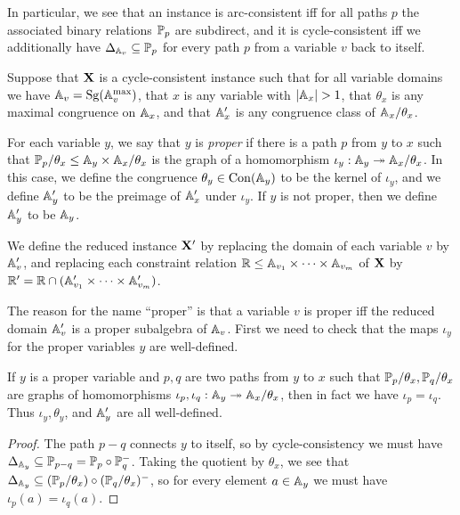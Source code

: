 \documentclass[letterpaper,11pt]{article}
\DeclareMathOperator{\Sg}{Sg}
\DeclareMathOperator{\Con}{Con}
\begin{document}
In particular, we see that an instance is arc-consistent iff for all paths $p$ the associated binary relations $\mathbb{P}_p$ are subdirect, and it is cycle-consistent iff we additionally have $\Delta_{\mathbb{A}_v} \subseteq \mathbb{P}_p$ for every path $p$ from a variable $v$ back to itself.

\begin{defn}\label{defn-proper-red} Suppose that $\mathbf{X}$ is a cycle-consistent instance such that for all variable domains we have $\bA_v = \Sg(\bA_v^{\max})$, that $x$ is any variable with $|\mathbb{A}_x| > 1$, that $\theta_x$ is any maximal congruence on $\mathbb{A}_x$, and that $\mathbb{A}_x'$ is any congruence class of $\mathbb{A}_x/\theta_x$.

For each variable $y$, we say that $y$ is \emph{proper} if there is a path $p$ from $y$ to $x$ such that $\mathbb{P}_p/\theta_x \le \mathbb{A}_y \times \mathbb{A}_x/\theta_x$ is the graph of a homomorphism $\iota_y : \mathbb{A}_y \twoheadrightarrow \mathbb{A}_x/\theta_x$. In this case, we define the congruence $\theta_y \in \Con(\bA_y)$ to be the kernel of $\iota_y$, and we define $\mathbb{A}_y'$ to be the preimage of $\mathbb{A}_x'$ under $\iota_y$. If $y$ is not proper, then we define $\mathbb{A}_y'$ to be $\mathbb{A}_y$.

We define the reduced instance $\mathbf{X}'$ by replacing the domain of each variable $v$ by $\mathbb{A}_v'$, and replacing each constraint relation $\mathbb{R} \le \mathbb{A}_{v_1} \times \cdots \times \mathbb{A}_{v_m}$ of $\mathbf{X}$ by $\mathbb{R}' = \mathbb{R} \cap (\mathbb{A}_{v_1}' \times \cdots \times \mathbb{A}_{v_m}')$.
\end{defn}

The reason for the name ``proper'' is that a variable $v$ is proper iff the reduced domain $\mathbb{A}_v'$ is a proper subalgebra of $\mathbb{A}_v$. First we need to check that the maps $\iota_y$ for the proper variables $y$ are well-defined.

\begin{lem} If $y$ is a proper variable and $p,q$ are two paths from $y$ to $x$ such that $\mathbb{P}_p/\theta_x, \mathbb{P}_q/\theta_x$ are graphs of homomorphisms $\iota_p, \iota_q : \mathbb{A}_y \twoheadrightarrow \mathbb{A}_x/\theta_x$, then in fact we have $\iota_p = \iota_q$. Thus $\iota_y, \theta_y$, and $\mathbb{A}_y'$ are all well-defined.
\end{lem}
\begin{proof} The path $p-q$ connects $y$ to itself, so by cycle-consistency we must have $\Delta_{\mathbb{A}_y} \subseteq \mathbb{P}_{p-q} = \mathbb{P}_p \circ \mathbb{P}_q^-$. Taking the quotient by $\theta_x$, we see that $\Delta_{\mathbb{A}_y} \subseteq (\mathbb{P}_p/\theta_x) \circ (\mathbb{P}_q/\theta_x)^-$, so for every element $a \in \mathbb{A}_y$ we must have $\iota_p(a) = \iota_q(a)$.
\end{proof}
\end{document}
